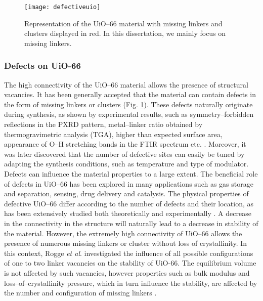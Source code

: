 \begin{figure}[!htbp]
	\centering
 	\texttt{[image: defectiveuio]}
	\caption{Representation of the UiO--66 material with missing linkers and clusters displayed in red. In this dissertation, we mainly focus on missing linkers.}
	\label{fig:defectiveuio}
\end{figure}

\subsubsection*{Defects on UiO-66}
The high connectivity of the UiO--66 material allows the presence of structural vacancies. It has been generally accepted that the material can contain defects in the form of missing linkers or clusters (Fig. \ref{fig:defectiveuio}). These defects naturally originate during synthesis, as shown by experimental results, such as symmetry--forbidden reflections in the PXRD pattern, metal--linker ratio obtained by thermogravimetric analysis (TGA), higher than expected surface area, appearance of O--H stretching bands in the FTIR spectrum etc. \cite{shearer2014tuned, valenzano2011disclosing}. Moreover, it was later discovered that the number of defective sites can easily be tuned by adapting the synthesis conditions, such as temperature and type of modulator\cite{wu2013unusual, shearer2016defect}. 
\npar
Defects can influence the material properties to a large extent. The beneficial role of defects in UiO--66 has been explored in many applications such as gas storage and separation\cite{wu2013unusual, ren2014modulated}, sensing\cite{stassen2016towards}, drug delivery\cite{cunha2013rationale} and catalysis\cite{vermoortele2013synthesis, rogge2017metal}. The physical properties of defective UiO--66 differ according to the number of defects and their location, as has been extensively studied both theoretically and experimentally \cite{rogge2016thermodynamic, devos2017missing, cliffe2014correlated, borges2016proton}. A decrease in the connectivity in the structure will naturally lead to a decrease in stability of the material. However, the extremely high connectivity of UiO--66 allows the presence of numerous missing linkers or cluster without loss of crystallinity. In this context, Rogge \textit{et al}. investigated the influence of all possible configurations of one to two linker vacancies on the stability of UiO-66. The equilibrium volume is not affected by such vacancies, however properties such as bulk modulus and loss--of--crystallinity pressure, which in turn influence the stability, are affected by the number and configuration of missing linkers \cite{rogge2016thermodynamic}. 
